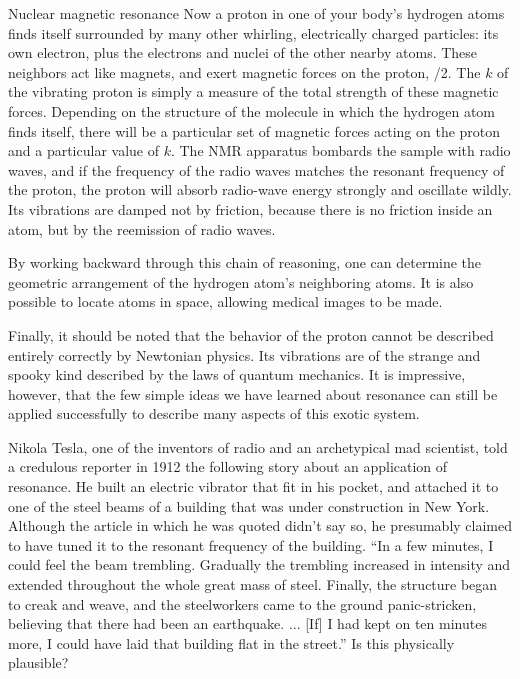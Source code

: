 \begin{eg}{Nuclear magnetic resonance}
Now a proton in one of your body's hydrogen atoms finds
itself surrounded by many other whirling, electrically
charged particles: its own electron, plus the electrons and
nuclei of the other nearby atoms. These neighbors act like
magnets, and exert magnetic forces on the proton, /2. The $k$ of
the vibrating proton is simply a measure of the total
strength of these magnetic forces. Depending on the
structure of the molecule in which the hydrogen atom finds
itself, there will be a particular set of magnetic forces
acting on the proton and a particular value of $k$. The NMR
apparatus bombards the sample with radio waves, and if the
frequency of the radio waves matches the resonant frequency
of the proton, the proton will absorb radio-wave energy
strongly and oscillate wildly. Its vibrations are damped not
by friction, because there is no friction inside an atom,
but by the reemission of radio waves.

By working backward through this chain of reasoning, one can
determine the geometric arrangement of the hydrogen atom's
neighboring atoms. It is also possible to locate atoms in
space, allowing medical images to be made.

Finally, it should be noted that the behavior of the proton
cannot be described entirely correctly by Newtonian physics.
Its vibrations are of the strange and spooky kind described
by the laws of quantum mechanics. It is impressive, however,
that the few simple ideas we have learned about resonance
can still be applied successfully to describe many aspects
of this exotic system.
\end{eg}

\startdq

\begin{dq}
Nikola Tesla, one of the inventors of radio and an
archetypical mad scientist, told a credulous reporter in 1912 the
following story about an application of resonance. He built
an electric vibrator that fit in his pocket, and attached it
to one of the steel beams of a building that was under
construction in New York. Although the article in which he
was quoted didn't say so, he presumably claimed to have
tuned it to the resonant frequency of the building. ``In a
few minutes, I could feel the beam trembling. Gradually the
trembling increased in intensity and extended throughout the
whole great mass of steel. Finally, the structure began to
creak and weave, and the steelworkers came to the ground
panic-stricken, believing that there had been an earthquake.
... [If] I had kept on ten minutes more, I could have laid
that building flat in the street.'' Is this physically plausible?
\end{dq}


